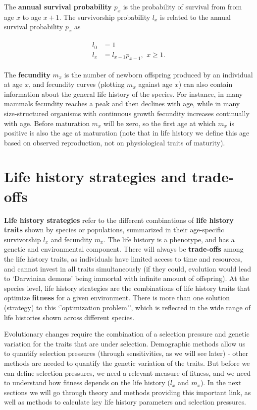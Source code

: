 \documentclass[
]{book}
\begin{document}
The \textbf{annual survival probability} \(p_x\) is the probability of survival from from age \(x\) to age \(x+1\). The survivorship probability \(l_x\) is related to the annual survival probability \(p_x\) as

\begin{align}
\begin{split}
l_0&=1\\
l_x&=l_{x-1}p_{x-1},\,\:x\geq 1.
\end{split}
\label{eq:survival}
\end{align}

The \textbf{fecundity} \(m_x\) is the number of newborn offspring produced by an individual at age \(x\), and fecundity curves (plotting \(m_x\) against age \(x\)) can also contain information about the general life history of the species. For instance, in many mammals fecundity reaches a peak and then declines with age, while in many size-structured organisms with continuous growth fecundity increases continually with age. Before maturation \(m_x\) will be zero, so the first age at which \(m_x\) is positive is also the age at maturation (note that in life history we define this age based on observed reproduction, not on physiological traits of maturity).

\hypertarget{life-history-strategies-and-trade-offs}{%
\section{Life history strategies and trade-offs}\label{life-history-strategies-and-trade-offs}}

\textbf{Life history strategies} refer to the different combinations of \textbf{life history traits} shown by species or populations, summarized in their age-specific survivorship \(l_x\) and fecundity \(m_x\). The life history is a phenotype, and has a genetic and environmental component. There will always be \textbf{trade-offs} among the life history traits, as individuals have limited access to time and resources, and cannot invest in all traits simultaneously (if they could, evolution would lead to `Darwinian demons' being immortal with infinite amount of offspring). At the species level, life history strategies are the combinations of life history traits that optimize \textbf{fitness} for a given environment. There is more than one solution (strategy) to this `'optimization problem'', which is reflected in the wide range of life histories shown across different species.

Evolutionary changes require the combination of a selection pressure and genetic variation for the traits that are under selection. Demographic methods allow us to quantify selection pressures (through sensitivities, as we will see later) - other methods are needed to quantify the genetic variation of the traits. But before we can define selection pressures, we need a relevant measure of fitness, and we need to understand how fitness depends on the life history (\(l_x\) and \(m_x\)). In the next sections we will go through theory and methods providing this important link, as well as methods to calculate key life history parameters and selection pressures.
\end{document}
